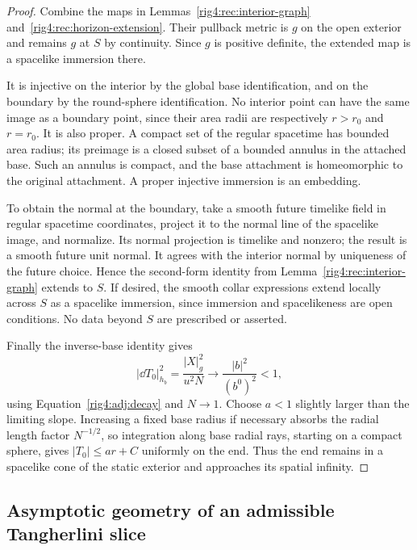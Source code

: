 \begin{proof}
Combine the maps in Lemmas~\ref{rig4:rec:interior-graph}
and~\ref{rig4:rec:horizon-extension}.  Their pullback metric is $g$ on the open
exterior and remains $g$ at $S$ by continuity.  Since $g$ is positive definite,
the extended map is a spacelike immersion there.

It is injective on the interior by the global base identification, and on the
boundary by the round-sphere identification.  No interior point can have the
same image as a boundary point, since their area radii are respectively
$r>r_0$ and $r=r_0$.  It is also proper.  A compact set of the regular
spacetime has bounded area radius; its preimage is a closed subset of a
bounded annulus in the attached base.  Such an annulus is compact, and the
base attachment is homeomorphic to the original attachment.  A proper
injective immersion is an embedding.

To obtain the normal at the boundary, take a smooth future timelike field in
regular spacetime coordinates, project it to the normal line of the spacelike
image, and normalize.  Its normal projection is timelike and nonzero; the
result is a smooth future unit normal.  It agrees with the interior normal
by uniqueness of the future choice.  Hence the second-form identity from
Lemma~\ref{rig4:rec:interior-graph} extends to $S$.  If desired, the smooth collar
expressions extend locally across $S$ as a spacelike immersion, since
immersion and spacelikeness are open conditions.  No data beyond $S$ are
prescribed or asserted.

Finally the inverse-base identity gives
\begin{equation}
 |\dd T_0|_{h_b}^2
 =\frac{|X|_g^2}{u^2N}
 \longrightarrow \frac{|b|^2}{(b^0)^2}<1,
 \label{rig4:rec:spatial-infinity}
\end{equation}
using Equation~\eqref{rig4:adj:decay} and $N\to1$.
Choose $a<1$ slightly larger than the limiting slope.  Increasing a fixed
base radius if necessary absorbs the radial length factor $N^{-1/2}$, so
integration along base radial rays, starting on a compact sphere, gives
$|T_0|\leq ar+C$ uniformly on the end.  Thus the end remains in a spacelike
cone of the static exterior and approaches its spatial infinity.
\end{proof}

\subsection{Asymptotic geometry of an admissible Tangherlini slice}

